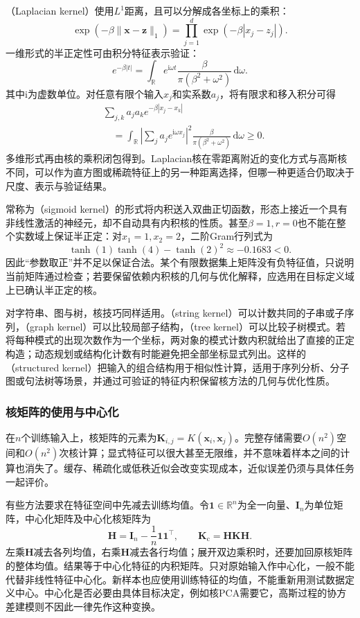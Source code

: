 （Laplacian kernel）使用$L^1$距离，且可以分解成各坐标上的乘积：
\[
  \exp(-\beta\lVert\bm{x}-\bm{z}\rVert_1)
  =\prod_{j=1}^d\exp(-\beta|x_j-z_j|).
\]
一维形式的半正定性可由积分特征表示验证：
\[
  e^{-\beta|t|}
  =\int_{\mathbb{R}}e^{\mathrm{i}\omega t}
      \frac{\beta}{\pi(\beta^2+\omega^2)}\,\mathrm{d}\omega.
\]
其中$\mathrm{i}$为虚数单位。对任意有限个输入$x_j$和实系数$a_j$，将有限求和移入积分可得
\[
  \begin{aligned}
    &\sum_{j,k}a_j a_k e^{-\beta|x_j-x_k|}\\
    &\quad=\int_{\mathbb{R}}
      \left|\sum_j a_j e^{\mathrm{i}\omega x_j}\right|^2
      \frac{\beta}{\pi(\beta^2+\omega^2)}\,\mathrm{d}\omega
      \ge0.
  \end{aligned}
\]
多维形式再由核的乘积闭包得到。Laplacian核在零距离附近的变化方式与高斯核不同，可以作为直方图或稀疏特征上的另一种距离选择，但哪一种更适合仍取决于尺度、表示与验证结果。

常称为（sigmoid kernel）的形式将内积送入双曲正切函数，形态上接近一个具有非线性激活的神经元，却不自动具有内积核的性质。甚至$\beta=1,r=0$也不能在整个实数域上保证半正定：对$x_1=1,x_2=2$，二阶Gram行列式为
\[
  \tanh(1)\tanh(4)-\tanh(2)^2
  \approx-0.1683<0.
\]
因此“参数取正”并不足以保证合法。某个有限数据集上矩阵没有负特征值，只说明当前矩阵通过检查；若要保留依赖内积核的几何与优化解释，应选用在目标定义域上已确认半正定的核。

对字符串、图与树，核技巧同样适用。（string kernel）可以计数共同的子串或子序列，（graph kernel）可以比较局部子结构，（tree kernel）可以比较子树模式。若将每种模式的出现次数作为一个坐标，两对象的模式计数内积就给出了直接的正定构造；动态规划或结构化计数有时能避免把全部坐标显式列出。这样的（structured kernel）把输入的组合结构用于相似性计算，适用于序列分析、分子图或句法树等场景，并通过可验证的特征内积保留核方法的几何与优化性质。

\subsubsection{核矩阵的使用与中心化}
\label{sec:classic-overview-kernel-matrix}

在$n$个训练输入上，核矩阵的元素为$\bm{K}_{i,j}=K(\bm{x}_i,\bm{x}_j)$。完整存储需要$O(n^2)$空间和$O(n^2)$次核计算；显式特征可以很大甚至无限维，并不意味着样本之间的计算也消失了。缓存、稀疏化或低秩近似会改变实现成本，近似误差仍须与具体任务一起评价。

有些方法要求在特征空间中先减去训练均值。令$\bm{1}\in\mathbb{R}^{n}$为全一向量、$\bm{I}_n$为单位矩阵，中心化矩阵及中心化核矩阵为
\begin{equation}
  \bm{H}=\bm{I}_n-\frac1n\bm{1}\bm{1}^{\top},
  \qquad \bm{K}_{\mathrm{c}}=\bm{H}\bm{K}\bm{H}.
  \label{eq:classic-overview-kernel-centering}
\end{equation}
左乘$\bm{H}$减去各列均值，右乘$\bm{H}$减去各行均值；展开双边乘积时，还要加回原核矩阵的整体均值。结果等于中心化特征的内积矩阵。只对原始输入作中心化，一般不能代替非线性特征中心化。新样本也应使用训练特征的均值，不能重新用测试数据定义中心。中心化是否必要由具体目标决定，例如核PCA需要它，高斯过程的协方差建模则不因此一律先作这种变换。
